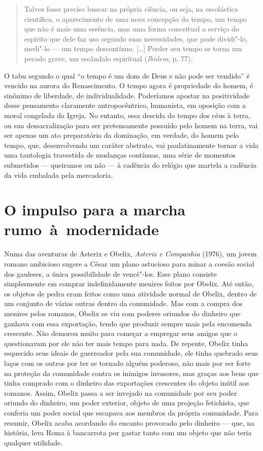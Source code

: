 \begin{quote}
Talvez fosse preciso buscar na própria ciência, ou seja, na escolástica
científica, o aparecimento de uma nova concepção do tempo, um tempo que
não é mais uma essência, mas uma forma conceitual a serviço do espírito
que dele faz uso segundo suas necessidades, que pode dividi"-lo, medi"-lo
--- um tempo descontínuo. [\ldots{}] Perder seu tempo se torna um
pecado grave, um escândalo espiritual (\emph{Ibidem}, p. 77).
\end{quote}

O tabu segundo o qual ``o tempo é um dom de Deus e não pode ser
vendido'' é vencido na aurora do Renascimento. O tempo agora é
propriedade do homem, é sinônimo de liberdade, de individualidade.
Poderíamos apostar na positividade desse pensamento claramente
antropocêntrico, humanista, em oposição com a moral congelada da Igreja.
No entanto, essa descida do tempo dos céus à terra, ou sua
dessacralização para ser pretensamente possuído pelo homem na terra, vai
ser apenas um ato preparatório da dominação, em verdade, do homem pelo
tempo, que, desenvolvendo um caráter abstrato, vai paulatinamente tornar a
vida uma tautologia travestida de mudanças contínuas, uma série de
momentos submetidos --- queiramos ou não --- à cadência do relógio que
martela a cadência da vida embalada pela mercadoria.

\section{O impulso para a marcha rumo~à~modernidade}

Numa das aventuras de Asterix e Obelix, \emph{Asterix e Companhia}
(1976), um jovem romano ambicioso sugere a César um plano astucioso para
minar a coesão social dos gauleses, a única possibilidade de vencê"-los.
Esse plano consiste simplesmente em comprar indefinidamente menires
feitos por Obelix. Até então, os objetos de pedra eram feitos como uma
atividade normal de Obelix, dentro de um conjunto de várias outras
dentro da comunidade. Mas com a compra dos menires pelos romanos, Obelix
se viu com poderes oriundos do dinheiro que ganhava com essa exportação,
tendo que produzir sempre mais pela encomenda crescente. Não demorou
muito para começar a empregar seus amigos que o questionavam por ele não
ter mais tempo para nada. De repente, Obelix tinha esquecido seus ideais
de guerreador pela sua comunidade, ele tinha quebrado seus laços com os
outros por ter se tornado alguém poderoso, não mais por ser forte na
proteção da comunidade contra os inimigos invasores, mas graças aos bens
que tinha comprado com o dinheiro das exportações crescentes do objeto
inútil aos romanos. Assim, Obelix passa a ser invejado na comunidade por
seu poder oriundo do dinheiro, um poder exterior, objeto de uma projeção
fetichista, que conferia um poder social que escapava aos membros
da própria comunidade. Para resumir, Obelix acaba acordando do
encanto provocado pelo dinheiro --- que, na história, leva Roma à
bancarrota por gastar tanto com um objeto que não teria qualquer
utilidade.

